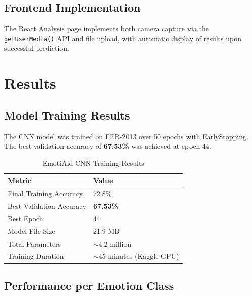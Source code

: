 \documentclass[a4paper,12pt,oneside]{report}
\begin{document}
\subsection{Frontend Implementation}

The React Analysis page implements both camera capture via the
\texttt{getUserMedia()} API and file upload, with automatic display of results
upon successful prediction.

\section{Results}

\subsection{Model Training Results}

The CNN model was trained on FER-2013 over 50 epochs with EarlyStopping. The best
validation accuracy of \textbf{67.53\%} was achieved at epoch 44.

\begin{table}[H]
\centering
\caption{EmotiAid CNN Training Results}
\begin{tabular}{|l|l|}
\hline
\textbf{Metric} & \textbf{Value} \\
\hline
Final Training Accuracy & 72.8\% \\
\hline
Best Validation Accuracy & \textbf{67.53\%} \\
\hline
Best Epoch & 44 \\
\hline
Model File Size & 21.9 MB \\
\hline
Total Parameters & $\sim$4.2 million \\
\hline
Training Duration & $\sim$45 minutes (Kaggle GPU) \\
\hline
\end{tabular}
\label{tab:results}
\end{table}

\subsection{Performance per Emotion Class}
\end{document}

